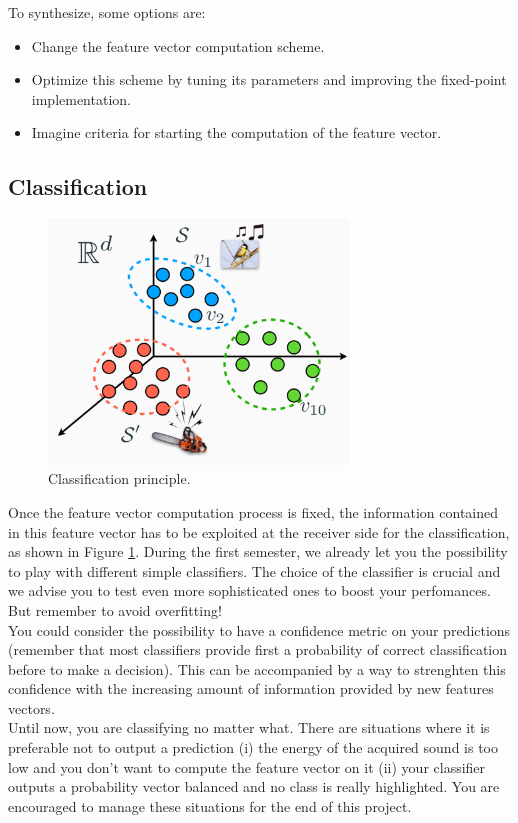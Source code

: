 To synthesize, some options are:
\begin{itemize}
    \item Change the feature vector computation scheme.
    \item Optimize this scheme by tuning its parameters and improving the
    fixed-point implementation.
    \item Imagine criteria for starting the computation of the feature vector.
\end{itemize}
%
\subsection{Classification}

\begin{figure}[H]
    \centering
    \includegraphics[width=8cm]{figs/classification.PNG}
    \caption{Classification principle.}
    \label{fig: classification}
\end{figure}
Once the feature vector computation process is fixed, the information contained in this feature vector has to be exploited at the receiver side for the classification, as shown in Figure \ref{fig: classification}. During the first semester, we already let you the possibility to play with different simple classifiers. The choice of the classifier is crucial and we advise you to test even more sophisticated ones to boost your perfomances. But remember to avoid overfitting! \\
You could consider the possibility to have a confidence metric on your predictions (remember that most classifiers provide first a probability of correct classification before to make a decision). This can be accompanied by a way to strenghten this confidence with the increasing amount of information provided by new features vectors. \\
Until now, you are classifying no matter what. There are situations where it is preferable not to output a prediction (i) the energy of the acquired sound is too low and you don't want to compute the feature vector on it (ii) your classifier outputs a probability vector balanced and no class is really highlighted. You are encouraged to manage these situations for the end of this project.


